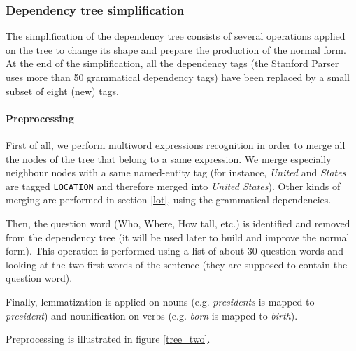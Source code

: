 
\subsubsection{Dependency tree simplification}
\label{dts}

The simplification of the dependency tree consists of several operations applied on the tree to change its shape and prepare the production of the normal form. At the end of the simplification, all the dependency tags (the Stanford Parser uses more than 50 grammatical dependency tags) have been replaced by a small subset of eight (new) tags.


\paragraph{Preprocessing}
\label{pre}

First of all, we perform multiword expressions recognition in order to merge all the nodes of the tree that belong to a same expression. We merge especially neighbour nodes with a same named-entity tag (for instance, \textit{United} and \textit{States} are tagged \texttt{LOCATION} and therefore merged into \textit{United States}). Other kinds of merging are performed in section \ref{lot}, using the grammatical dependencies.

Then, the question word (Who, Where, How tall, etc.) is identified and removed from the dependency tree (it will be used later to build and improve the normal form). This operation is performed using a list of about 30 question words and looking at the two first words of the sentence (they are supposed to contain the question word).

Finally, lemmatization is applied on nouns (e.g. \textit{presidents} is mapped to \textit{president}) and nounification on verbs (e.g. \textit{born} is mapped to \textit{birth}).

Preprocessing is illustrated in figure \ref{tree_two}.

